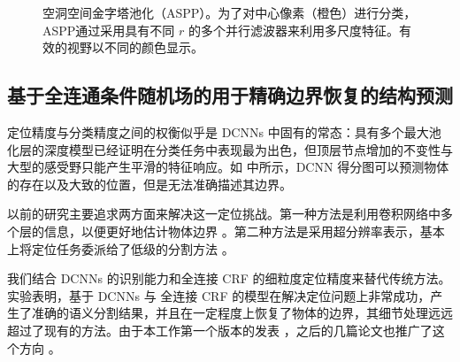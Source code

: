 \begin{figure}[!t]
  \centering
  \caption{空洞空间金字塔池化（ASPP）。为了对中心像素（橙色）进行分类，ASPP通过采用具有不同 $r$ 的多个并行滤波器来利用多尺度特征。有效的视野以不同的颜色显示。}
  \label{fig:aspp_fov}
\end{figure}

\subsection{基于全连通条件随机场的用于精确边界恢复的结构预测}
\label{sec:boundary-recovery}

定位精度与分类精度之间的权衡似乎是 DCNNs 中固有的常态：具有多个最大池化层的深度模型已经证明在分类任务中表现最为出色，但顶层节点增加的不变性与大型的感受野只能产生平滑的特征响应。如  中所示，DCNN 得分图可以预测物体的存在以及大致的位置，但是无法准确描述其边界。

以前的研究主要追求两方面来解决这一定位挑战。第一种方法是利用卷积网络中多个层的信息，以便更好地估计物体边界 \cite{hariharan2014hypercolumns, long2014fully, eigen2014predicting}。第二种方法是采用超分辨率表示，基本上将定位任务委派给了低级的分割方法 \cite{mostajabi2014feedforward}。

我们结合 DCNNs 的识别能力和全连接 CRF 的细粒度定位精度来替代传统方法。实验表明，基于 DCNNs 与 全连接 CRF 的模型在解决定位问题上非常成功，产生了准确的语义分割结果，并且在一定程度上恢复了物体的边界，其细节处理远远超过了现有的方法。由于本工作第一个版本的发表 \cite{chen2014semantic}，之后的几篇论文也推广了这个方向 \cite{papandreou2015weakly, schwing2015fully, zheng2015conditional, dai2015boxsup, noh2015learning, liu2015semantic, lin2015efficient, chen2015attention, chen2015semantic}。

